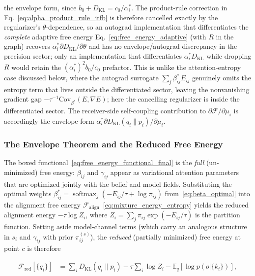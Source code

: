 \documentclass[11pt]{article}
\providecommand{\softmax}{\operatorname{softmax}}
\begin{document}
the envelope form, since $b_0 + D_{\mathrm{KL}} = c_0/\alpha_i^*$. The product-rule correction in Eq.~\eqref{eq:alpha_product_rule_itfb} is therefore cancelled exactly by the regularizer's $\theta$-dependence, so an autograd implementation that differentiates the \emph{complete} adaptive free energy Eq.~\eqref{eq:free_energy_adaptive} (with $R$ in the graph) recovers $\alpha_i^* \partial D_{\mathrm{KL}}/\partial\theta$ and has no envelope/autograd discrepancy in the precision sector; only an implementation that differentiates $\alpha_i^* D_{\mathrm{KL}}$ while dropping $R$ would retain the $(\alpha_i^*)^2 b_0/c_0$ prefactor. This is unlike the attention-entropy case discussed below, where the autograd surrogate $\sum_j\beta_{ij}^* E_{ij}$ genuinely omits the entropy term that lives outside the differentiated sector, leaving the nonvanishing gradient gap $-\tau^{-1}\mathrm{Cov}_{\beta^*}(E,\nabla E)$; here the cancelling regularizer is inside the differentiated sector. The receiver-side self-coupling contribution to $\partial\mathcal{F}/\partial\mu_i$ is accordingly the envelope-form $\alpha_i^* \partial D_{\mathrm{KL}}(q_i\|p_i)/\partial\mu_i$.

\subsubsection{The Envelope Theorem and the Reduced Free Energy}
\label{sec:envelope_theorem}

The boxed functional~\eqref{eq:free_energy_functional_final} is the \emph{full} (un-minimized) free energy: $\beta_{ij}$ and $\gamma_{ij}$ appear as variational attention parameters that are optimized jointly with the belief and model fields. Substituting the optimal weights $\beta_{ij}^* = \softmax_j(-E_{ij}/\tau + \log\pi_{ij})$ from~\eqref{eq:beta_optimal} into the alignment free energy $\mathcal{F}_{\text{align}}$~\eqref{eq:mixture_energy_entropy} yields the reduced alignment energy $-\tau\log Z_i$, where $Z_i = \sum_j \pi_{ij}\exp(-E_{ij}/\tau)$ is the partition function. Setting aside model-channel terms (which carry an analogous structure in $s_i$ and $\gamma_{ij}$ with prior $\pi^{(s)}_{ij}$), the \emph{reduced} (partially minimized) free energy at point $c$ is therefore

\begin{equation}
\boxed{
\begin{aligned}
\mathcal{F}_{\mathrm{red}}[\{q_i\}]
&=\sum_i D_{\mathrm{KL}}(q_i\|p_i)
-\tau\sum_i \log Z_i
-\mathbb{E}_q[\log p(o|\{k_i\})],
\end{aligned}
}
\label{eq:free_energy_reduced}
\end{equation}
\end{document}
